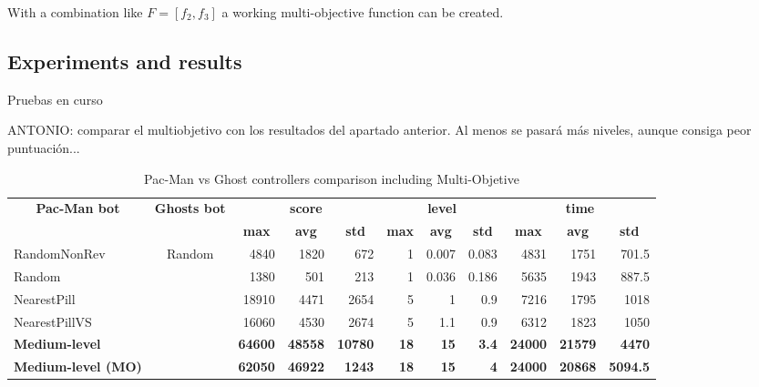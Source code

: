 \documentclass{llncs}
\newcommand{\paco}{Pac-Man }
\begin{document}
With a combination like $F = [f_2, f_3]$ a working multi-objective function can be created.

\subsection{Experiments and results}
{\color{red} Pruebas en curso}

{\color{red}ANTONIO: comparar el multiobjetivo con los resultados del apartado anterior. Al menos se pasará más niveles, aunque consiga peor puntuación...}

\begin{table}[H]
\centering
\caption{\paco vs Ghost controllers comparison including Multi-Objetive}
\label{my-label}
\begin{tabular}{|l|c|r|r|r|r|r|r|r|r|r|}
\hline
\multicolumn{1}{|c|}{\multirow{2}{*}{\textbf{Pac-Man bot}}} & \multirow{2}{*}{\textbf{Ghosts bot}} & \multicolumn{3}{c|}{\textbf{score}} & \multicolumn{3}{c|}{\textbf{level}} & \multicolumn{3}{c|}{\textbf{time}} \\ \cline{3-11} 
\multicolumn{1}{|c|}{} &  & \multicolumn{1}{c|}{\textbf{max}} & \multicolumn{1}{c|}{\textbf{avg}} & \multicolumn{1}{c|}{\textbf{std}} & \multicolumn{1}{c|}{\textbf{max}} & \multicolumn{1}{c|}{\textbf{avg}} & \multicolumn{1}{c|}{\textbf{std}} & \multicolumn{1}{c|}{\textbf{max}} & \multicolumn{1}{c|}{\textbf{avg}} & \multicolumn{1}{c|}{\textbf{std}} \\ \hline
RandomNonRev & \multirow{8}{*}{Random} & 4840 & 1820 & 672 & 1 & 0.007 & 0.083 & 4831 & 1751 & 701.5 \\ \cline{1-1} \cline{3-11} 
Random &  & 1380 & 501 & 213 & 1 & 0.036 & 0.186 & 5635 & 1943 & 887.5 \\ \cline{1-1} \cline{3-11} 
NearestPill &  & 18910 & 4471 & 2654 & 5 & 1 & 0.9 & 7216 & 1795 & 1018 \\ \cline{1-1} \cline{3-11} 
NearestPillVS &  & 16060 & 4530 & 2674 & 5 & 1.1 & 0.9 & 6312 & 1823 & 1050 \\ \cline{1-1} \cline{3-11} 
\textbf{Medium-level} &  & \textbf{64600} & \textbf{48558} & \textbf{10780} & \textbf{18} & \textbf{15} & \textbf{3.4} & \textbf{24000} & \textbf{21579} & \textbf{4470} \\ \cline{1-1} \cline{3-11} 
\textbf{Medium-level (MO)} &  & \textbf{62050} & \textbf{46922} & \textbf{1243} & \textbf{18} & \textbf{15} & \textbf{4} & \textbf{24000} & \textbf{20868} & \textbf{5094.5} \\ \cline{1-1} \cline{3-11} 

\end{tabular}
\end{table}
\end{document}
